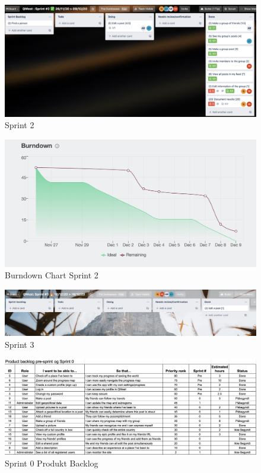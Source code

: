 \begin{figure}
    \includegraphics[width=\linewidth]{figures/Sprint 2.png}
    \caption{Sprint 2}
    \label{fig:Sp2}
\end{figure}



\begin{figure}
    \includegraphics[width=\linewidth]{figures/Sprint 2 Burndown.png}
    \caption{Burndown Chart Sprint 2}
    \label{fig:Bc2}
\end{figure}

\begin{figure}
    \includegraphics[width=\linewidth]{figures/Sprint 3 .png}
    \caption{{Sprint 3}}
    \label{fig:Sp3}
\end{figure}


\begin{figure}
    \includegraphics[width=\linewidth]{figures/Sprint 0 copy.png}
    \caption{{Sprint 0 Produkt Backlog}}
    \label{fig:Sp0PB}
\end{figure}



